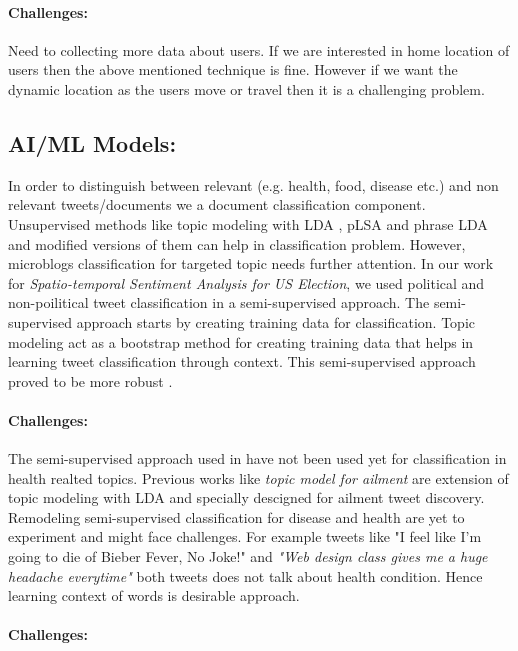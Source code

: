 \vspace{-2mm}
\paragraph{Challenges:}
Need to collecting more data about users. If we are interested in home location of users then the above mentioned \cite{compton2014geotagging} technique is fine. However if we want the dynamic location as the users move or travel then it is a challenging problem.


\subsection{AI/ML Models:}
In order to distinguish between relevant (e.g. health, food, disease etc.) and  non relevant tweets/documents we a document classification component. Unsupervised methods like topic modeling with LDA \cite{}, pLSA \cite{} and phrase LDA \cite{} and modified versions of them can help in classification problem. However, microblogs classification for targeted topic needs further attention. In our work \cite{compasskdd} for {\em Spatio-temporal Sentiment Analysis for US Election}, we used political and non-poilitical tweet classification in a semi-supervised approach. The semi-supervised approach starts by creating training data for classification. Topic modeling act as a bootstrap method for creating training data that helps in learning tweet classification through context. This semi-supervised approach proved to be more robust \cite{compasskdd}.

\vspace{-2mm}
\paragraph{Challenges:}
The semi-supervised approach used in \cite{compasskdd} have not been used yet for classification in health realted topics. Previous works like {\em topic model for ailment} \cite{} are extension of topic modeling with LDA and specially descigned for ailment tweet discovery. Remodeling semi-supervised classification for disease and health are yet to experiment and might face challenges.
For example tweets like {"I feel like I'm going to die of Bieber Fever, No Joke!"} and  {\em "Web design class gives me a huge headache everytime"} both tweets does not talk about health condition. Hence learning context of words is desirable approach.


\vspace{-2mm}
\paragraph{Challenges:}

